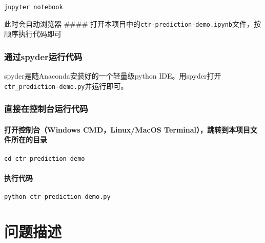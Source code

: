 \documentclass[11pt]{article}
\begin{document}
\begin{verbatim}
jupyter notebook
\end{verbatim}

此时会自动浏览器 \#\#\#\#
打开本项目中的\texttt{ctr-prediction-demo.ipynb}文件，按顺序执行代码即可

    \subsubsection{通过spyder运行代码}\label{ux901aux8fc7spyderux8fd0ux884cux4ee3ux7801}

spyder是随Anaconda安装好的一个轻量级python
IDE。用spyder打开\texttt{ctr\_prediction-demo.py}并运行即可。

    \subsubsection{直接在控制台运行代码}\label{ux76f4ux63a5ux5728ux63a7ux5236ux53f0ux8fd0ux884cux4ee3ux7801}

\paragraph{打开控制台（Windows CMD，Linux/MacOS
Terminal），跳转到本项目文件所在的目录}\label{ux6253ux5f00ux63a7ux5236ux53f0windows-cmdlinuxmacos-terminalux8df3ux8f6cux5230ux672cux9879ux76eeux6587ux4ef6ux6240ux5728ux7684ux76eeux5f55}

\begin{verbatim}
cd ctr-prediction-demo
\end{verbatim}

\paragraph{执行代码}\label{ux6267ux884cux4ee3ux7801}

\begin{verbatim}
python ctr-prediction-demo.py
\end{verbatim}

    \section{问题描述}\label{ux95eeux9898ux63cfux8ff0}
\end{document}
